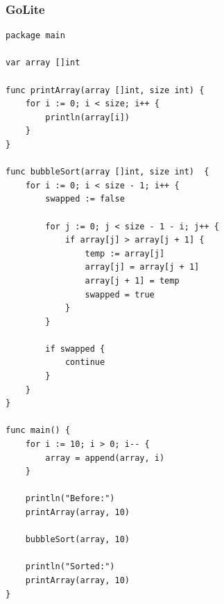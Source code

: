\documentclass{article}
\begin{document}
\subsubsection{GoLite}
\begin{lstlisting}
package main

var array []int

func printArray(array []int, size int) {
    for i := 0; i < size; i++ {
        println(array[i])
    }
}

func bubbleSort(array []int, size int)  {
    for i := 0; i < size - 1; i++ {
        swapped := false

        for j := 0; j < size - 1 - i; j++ {
            if array[j] > array[j + 1] {
                temp := array[j]
                array[j] = array[j + 1]
                array[j + 1] = temp
                swapped = true
            }
        }

        if swapped {
            continue
        }
    }
}

func main() {
    for i := 10; i > 0; i-- {
        array = append(array, i)
    }

    println("Before:")
    printArray(array, 10)

    bubbleSort(array, 10)

    println("Sorted:")
    printArray(array, 10)
}

\end{lstlisting}
\end{document}
